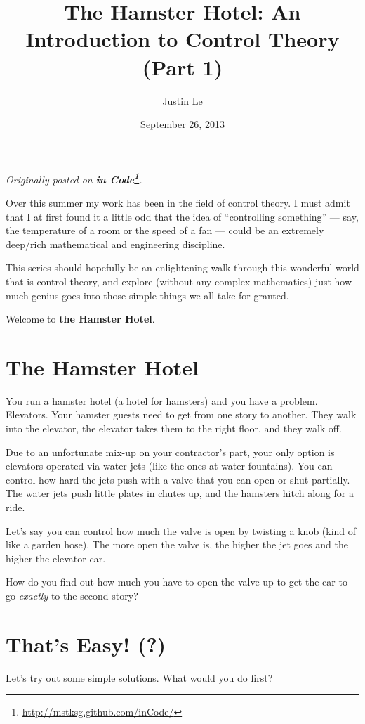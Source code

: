 \documentclass[]{article}
\title{The Hamster Hotel: An Introduction to Control Theory (Part 1)}
\author{Justin Le}
\date{September 26, 2013}
\renewcommand{\href}[2]{#2\footnote{\url{#1}}}
\begin{document}
\maketitle

\emph{Originally posted on
\textbf{\href{http://mstksg.github.com/inCode/}{in Code}}.}

Over this summer my work has been in the field of control theory. I must
admit that I at first found it a little odd that the idea of
``controlling something'' --- say, the temperature of a room or the
speed of a fan --- could be an extremely deep/rich mathematical and
engineering discipline.

This series should hopefully be an enlightening walk through this
wonderful world that is control theory, and explore (without any complex
mathematics) just how much genius goes into those simple things we all
take for granted.

Welcome to \textbf{the Hamster Hotel}.

\section{The Hamster Hotel}\label{the-hamster-hotel}

You run a hamster hotel (a hotel for hamsters) and you have a problem.
Elevators. Your hamster guests need to get from one story to another.
They walk into the elevator, the elevator takes them to the right floor,
and they walk off.

Due to an unfortunate mix-up on your contractor's part, your only option
is elevators operated via water jets (like the ones at water fountains).
You can control how hard the jets push with a valve that you can open or
shut partially. The water jets push little plates in chutes up, and the
hamsters hitch along for a ride.

Let's say you can control how much the valve is open by twisting a knob
(kind of like a garden hose). The more open the valve is, the higher the
jet goes and the higher the elevator car.

How do you find out how much you have to open the valve up to get the
car to go \emph{exactly} to the second story?

\section{That's Easy! (?)}\label{thats-easy}

Let's try out some simple solutions. What would you do first?
\end{document}
